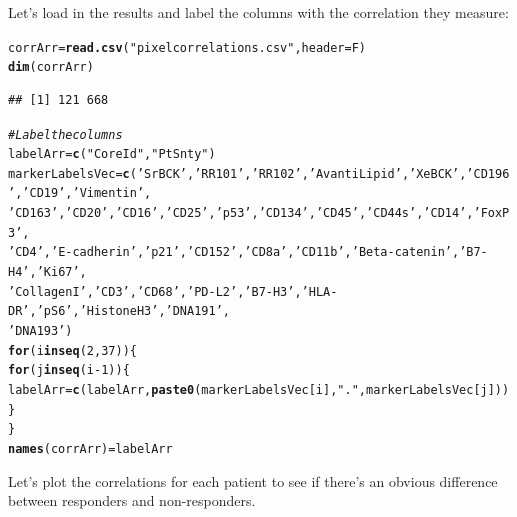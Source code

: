 \documentclass[a4paper]{article}\usepackage[]{graphicx}\usepackage[]{color}
\makeatletter
\newcommand{\hlnum}[1]{\textcolor[rgb]{0.686,0.059,0.569}{#1}}%
\newcommand{\hlstr}[1]{\textcolor[rgb]{0.192,0.494,0.8}{#1}}%
\newcommand{\hlcom}[1]{\textcolor[rgb]{0.678,0.584,0.686}{\textit{#1}}}%
\newcommand{\hlopt}[1]{\textcolor[rgb]{0,0,0}{#1}}%
\newcommand{\hlstd}[1]{\textcolor[rgb]{0.345,0.345,0.345}{#1}}%
\newcommand{\hlkwa}[1]{\textcolor[rgb]{0.161,0.373,0.58}{\textbf{#1}}}%
\newcommand{\hlkwb}[1]{\textcolor[rgb]{0.69,0.353,0.396}{#1}}%
\newcommand{\hlkwc}[1]{\textcolor[rgb]{0.333,0.667,0.333}{#1}}%
\newcommand{\hlkwd}[1]{\textcolor[rgb]{0.737,0.353,0.396}{\textbf{#1}}}%
\newenvironment{kframe}{%
 \def\at@end@of@kframe{}%
 \ifinner\ifhmode%
  \def\at@end@of@kframe{\end{minipage}}%
  \begin{minipage}{\columnwidth}%
 \fi\fi%
 \def\FrameCommand##1{\hskip\@totalleftmargin \hskip-\fboxsep
 \colorbox{shadecolor}{##1}\hskip-\fboxsep
     \hskip-\linewidth \hskip-\@totalleftmargin \hskip\columnwidth}%
 \MakeFramed {\advance\hsize-\width
   \@totalleftmargin\z@ \linewidth\hsize
   \@setminipage}}%
 {\par\unskip\endMakeFramed%
 \at@end@of@kframe}
\newenvironment{knitrout}{}{} %
\makeatother
\begin{document}
Let's load in the results and label the columns with the correlation they measure:
\begin{knitrout}
\color{fgcolor}\begin{kframe}
\begin{alltt}
\hlstd{corrArr} \hlkwb{=} \hlkwd{read.csv}\hlstd{(}\hlstr{"pixelcorrelations.csv"}\hlstd{,}\hlkwc{header}\hlstd{=F)}
\hlkwd{dim}\hlstd{(corrArr)}
\end{alltt}
\begin{verbatim}
## [1] 121 668
\end{verbatim}
\begin{alltt}
\hlcom{# Label the columns}
\hlstd{labelArr} \hlkwb{=} \hlkwd{c}\hlstd{(}\hlstr{"CoreId"}\hlstd{,}\hlstr{"PtSnty"}\hlstd{)}
\hlstd{markerLabelsVec} \hlkwb{=} \hlkwd{c}\hlstd{(}\hlstr{'SrBCK'}\hlstd{,} \hlstr{'RR101'}\hlstd{,} \hlstr{'RR102'}\hlstd{,} \hlstr{'AvantiLipid'}\hlstd{,} \hlstr{'XeBCK'}\hlstd{,} \hlstr{'CD196'}\hlstd{,} \hlstr{'CD19'}\hlstd{,} \hlstr{'Vimentin'}\hlstd{,}
                    \hlstr{'CD163'}\hlstd{,} \hlstr{'CD20'}\hlstd{,} \hlstr{'CD16'}\hlstd{,} \hlstr{'CD25'}\hlstd{,} \hlstr{'p53'}\hlstd{,} \hlstr{'CD134'}\hlstd{,} \hlstr{'CD45'}\hlstd{,} \hlstr{'CD44s'}\hlstd{,} \hlstr{'CD14'}\hlstd{,} \hlstr{'FoxP3'}\hlstd{,}
                    \hlstr{'CD4'}\hlstd{,} \hlstr{'E-cadherin'}\hlstd{,} \hlstr{'p21'}\hlstd{,} \hlstr{'CD152'}\hlstd{,} \hlstr{'CD8a'}\hlstd{,} \hlstr{'CD11b'}\hlstd{,} \hlstr{'Beta-catenin'}\hlstd{,} \hlstr{'B7-H4'}\hlstd{,} \hlstr{'Ki67'}\hlstd{,}
                    \hlstr{'CollagenI'}\hlstd{,} \hlstr{'CD3'}\hlstd{,} \hlstr{'CD68'}\hlstd{,} \hlstr{'PD-L2'}\hlstd{,} \hlstr{'B7-H3'}\hlstd{,} \hlstr{'HLA-DR'}\hlstd{,} \hlstr{'pS6'}\hlstd{,} \hlstr{'HistoneH3'}\hlstd{,} \hlstr{'DNA191'}\hlstd{,}
                    \hlstr{'DNA193'}\hlstd{)}
\hlkwa{for} \hlstd{(i} \hlkwa{in} \hlkwd{seq}\hlstd{(}\hlnum{2}\hlstd{,}\hlnum{37}\hlstd{)) \{}
  \hlkwa{for} \hlstd{(j} \hlkwa{in} \hlkwd{seq}\hlstd{(i}\hlopt{-}\hlnum{1}\hlstd{)) \{}
    \hlstd{labelArr} \hlkwb{=} \hlkwd{c}\hlstd{(labelArr,}\hlkwd{paste0}\hlstd{(markerLabelsVec[i],}\hlstr{"."}\hlstd{,markerLabelsVec[j]))}
  \hlstd{\}}
\hlstd{\}}
\hlkwd{names}\hlstd{(corrArr)} \hlkwb{=} \hlstd{labelArr}
\end{alltt}
\end{kframe}
\end{knitrout}

Let's plot the correlations for each patient to see if there's an obvious difference between responders and non-responders.
\end{document}
